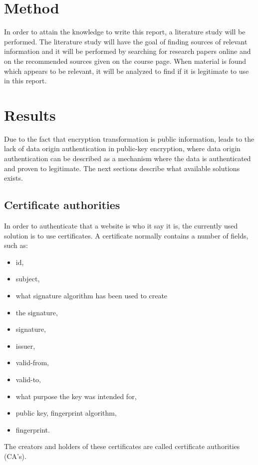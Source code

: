 \documentclass{acm_proc_article-sp}
\begin{document}
\section{Method} %
In order to attain the knowledge to write this report, a literature study will be performed. The literature study will have the goal of finding sources of relevant information and it will be performed by searching for research papers online and on the recommended sources given on the course page. When material is found which appears to be relevant, it will be analyzed to find if it is legitimate to use in this report. 



\section{Results}
Due to the fact that encryption transformation is public information, leads to the lack of data origin authentication in public-key encryption, where data origin authentication can be described as a mechanism where the data is authenticated and proven to legitimate. The next sections describe what available solutions exists. %

\subsection{Certificate authorities}
In order to authenticate that a website is who it say it is,
the currently used solution is to use certificates. A certificate
normally contains a number of fields, such as: 
\begin{itemize}
    \item id,
    \item subject, 
    \item what signature algorithm has been used to create
    \item the signature,
    \item signature,
    \item issuer,
    \item valid-from,
    \item valid-to,
    \item what purpose the key was intended for,
    \item public key, fingerprint algorithm,
    \item fingerprint.
\end{itemize}
The creators and holders of these certificates are called certificate authorities (CA's).
\end{document}
